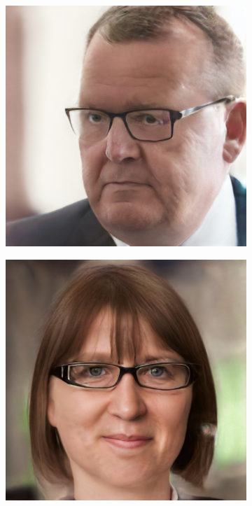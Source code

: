 \begin{figure}[h!]
\begin{subfigure}[b]{0.24\textwidth}
    \end{subfigure}
    \begin{subfigure}[b]{0.24\textwidth}
        \includegraphics[width=\textwidth]{fig/stylegan/faceedit/lars-glasses}

    \end{subfigure}
    \begin{subfigure}[b]{0.24\textwidth}
        \includegraphics[width=\textwidth]{fig/stylegan/faceedit/mette-glasses}


\end{subfigure}
\end{figure}
